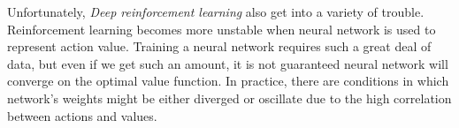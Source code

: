 \documentclass{article}
\DeclareMathOperator*{\argmax}{arg\,max}
\begin{document}
    
    
    
    
            
            
            
            
            
            
            

Unfortunately, \textit{Deep reinforcement learning} also get into a variety of trouble. Reinforcement learning becomes more unstable when neural network is used to represent action value. Training a neural network requires such a great deal of data, but even if we get such an amount, it is not guaranteed neural network will converge on the optimal value function. In practice, there are conditions in which network's weights might be either diverged or oscillate due to the high correlation between actions and values.\\
\end{document}
